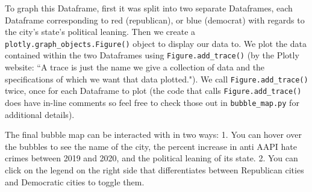 \documentclass[fontsize=11pt]{article}
\begin{document}
    To graph this Dataframe, first it was split into two separate Dataframes, each Dataframe corresponding to red (republican), or blue (democrat) with regards to the city's state's political leaning. Then we create a \newline \texttt{plotly.graph\_objects.Figure()} object to display our data to. We plot the data contained within the two Dataframes using \texttt{Figure.add\_trace()} (by the Plotly website: “A trace is just the name we give a collection of data and the specifications of which we want that data plotted."). We call \texttt{Figure.add\_trace()} twice, once for each Dataframe to plot (the code that calls \texttt{Figure.add\_trace()} does have in-line comments so feel free to check those out in \texttt{bubble\_map.py} for additional details).

    The final bubble map can be interacted with in two ways:
    1. You can hover over the bubbles to see the name of the city, the percent increase in anti AAPI hate crimes between 2019 and 2020, and the political leaning of its state.
    2. You can click on the legend on the right side that differentiates between Republican cities and Democratic cities to toggle them. \\
\end{document}
